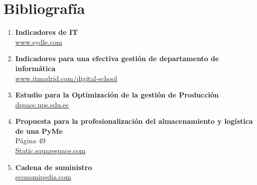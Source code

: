 \documentclass[12pt]{article}
\begin{document}
\newpage
\section{Bibliografía}

\begin{enumerate}
  \item \textbf{Indicadores de IT}\\ 
        \href{https://www.sydle.com/es/blog/indicadores-de-ti-605a2bd0b7cdda685648b68a}{www.sydle.com}

  \item \textbf{Indicadores para una efectiva gestión de departamento de informática}\\
        \href{https://www.itmadrid.com/5-indicadores-o-kpi-clave-para-una-efectiva-gestion-de-los-departamentos-tic-o-informatica/}{www.itmadrid.com/digital-school}

  \item \textbf{Estudio para la Optimización de la gestión de Producción}\\
        \href{https://dspace.ups.edu.ec/bitstream/123456789/5387/1/UPS-GT000505.pdf}{dspace.ups.edu.ec}

  \item \textbf{Propuesta para la profesionalización del almacenamiento y logística de una PyMe}\\ 
        Página 49\\
        \href{https://static1.squarespace.com/static/55564587e4b0d1d3fb1eda6b/t/5e29ce73907bc30696980607/1579798160559/Tomo+06+-+Memorias+Congreso+Academia+Journals+Celaya+2019.pdf}{Static.squarespace.com}
  
  \item \textbf{Cadena de suministro}\\
        \href{https://economipedia.com/definiciones/cadena-de-suministro.html}{economipedia.com}

\end{enumerate}
\end{document}

